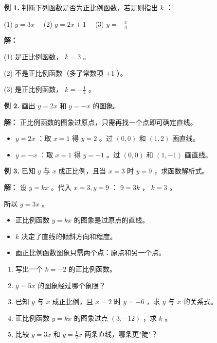 \begin{workedexamples}


\textbf{例 1.} 判断下列函数是否为正比例函数，若是则指出 $k$ ：

(1) $y = 3x$ 　(2) $y = 2x + 1$ 　(3) $y = -\frac{x}{4}$

\textbf{解：}

(1) 是正比例函数， $k = 3$ 。

(2) 不是正比例函数（多了常数项 $+1$ ）。

(3) 是正比例函数， $k = -\frac{1}{4}$ 。

\textbf{例 2.} 画出 $y = 2x$ 和 $y = -x$ 的图象。

\textbf{解：} 正比例函数的图象过原点，只需再找一个点即可确定直线。

\begin{itemize}
  \item $y = 2x$ ：取 $x = 1$ 得 $y = 2$ 。过 $(0,0)$ 和 $(1,2)$ 画直线。
  \item $y = -x$ ：取 $x = 1$ 得 $y = -1$ 。过 $(0,0)$ 和 $(1,-1)$ 画直线。
\end{itemize}


\textbf{例 3.} 已知 $y$ 与 $x$ 成正比例，且当 $x = 3$ 时 $y = 9$ ，求函数解析式。

\textbf{解：} 设 $y = kx$ 。代入 $x = 3, y = 9$ ： $9 = 3k$ ， $k = 3$ 。

所以 $y = 3x$ 。

\end{workedexamples}

\begin{keytakeaway}


\begin{itemize}
  \item 正比例函数 $y = kx$ 的图象是过原点的直线。
  \item $k$ 决定了直线的倾斜方向和程度。
  \item 画正比例函数图象只需两个点：原点和另一个点。
\end{itemize}


\end{keytakeaway}

\begin{practice}


\begin{enumerate}
  \item 写出一个 $k = -2$ 的正比例函数。
  \item $y = 5x$ 的图象经过哪个象限？
  \item 已知 $y$ 与 $x$ 成正比例，且 $x = 2$ 时 $y = -6$ ，求 $y$ 与 $x$ 的关系式。
  \item 正比例函数 $y = kx$ 的图象过点 $(3, -12)$ ，求 $k$ 。
  \item 比较 $y = 3x$ 和 $y = \frac{1}{2}x$ 两条直线，哪条更"陡"？
\end{enumerate}


\end{practice}

